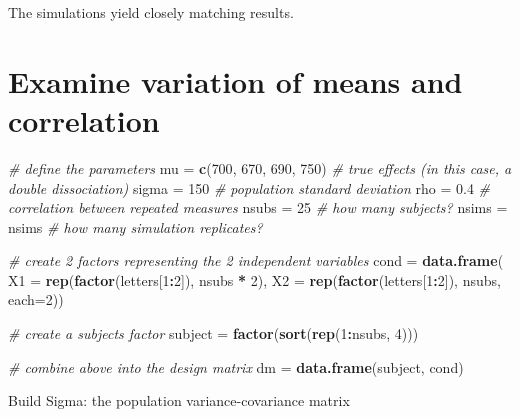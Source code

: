 \documentclass[]{book}
\newenvironment{Shaded}{\begin{snugshade}}{\end{snugshade}}
\newcommand{\CommentTok}[1]{\textcolor[rgb]{0.56,0.35,0.01}{\textit{#1}}}
\newcommand{\DataTypeTok}[1]{\textcolor[rgb]{0.13,0.29,0.53}{#1}}
\newcommand{\DecValTok}[1]{\textcolor[rgb]{0.00,0.00,0.81}{#1}}
\newcommand{\FloatTok}[1]{\textcolor[rgb]{0.00,0.00,0.81}{#1}}
\newcommand{\KeywordTok}[1]{\textcolor[rgb]{0.13,0.29,0.53}{\textbf{#1}}}
\newcommand{\NormalTok}[1]{#1}
\newcommand{\OperatorTok}[1]{\textcolor[rgb]{0.81,0.36,0.00}{\textbf{#1}}}
\newcommand{\StringTok}[1]{\textcolor[rgb]{0.31,0.60,0.02}{#1}}
\begin{document}
The simulations yield closely matching results.

\hypertarget{examine-variation-of-means-and-correlation}{%
\section{Examine variation of means and correlation}\label{examine-variation-of-means-and-correlation}}

\begin{Shaded}
\begin{Highlighting}[]
\CommentTok{# define the parameters}
\NormalTok{mu =}\StringTok{ }\KeywordTok{c}\NormalTok{(}\DecValTok{700}\NormalTok{, }\DecValTok{670}\NormalTok{, }\DecValTok{690}\NormalTok{, }\DecValTok{750}\NormalTok{) }\CommentTok{# true effects (in this case, a double dissociation)}
\NormalTok{sigma =}\StringTok{ }\DecValTok{150}  \CommentTok{# population standard deviation}
\NormalTok{rho =}\StringTok{ }\FloatTok{0.4} \CommentTok{# correlation between repeated measures}
\NormalTok{nsubs =}\StringTok{ }\DecValTok{25} \CommentTok{# how many subjects?}
\NormalTok{nsims =}\StringTok{ }\NormalTok{nsims }\CommentTok{# how many simulation replicates?}
 
\CommentTok{# create 2 factors representing the 2 independent variables}
\NormalTok{cond =}\StringTok{ }\KeywordTok{data.frame}\NormalTok{(}
  \DataTypeTok{X1 =} \KeywordTok{rep}\NormalTok{(}\KeywordTok{factor}\NormalTok{(letters[}\DecValTok{1}\OperatorTok{:}\DecValTok{2}\NormalTok{]), nsubs }\OperatorTok{*}\StringTok{ }\DecValTok{2}\NormalTok{),}
  \DataTypeTok{X2 =} \KeywordTok{rep}\NormalTok{(}\KeywordTok{factor}\NormalTok{(letters[}\DecValTok{1}\OperatorTok{:}\DecValTok{2}\NormalTok{]), nsubs, }\DataTypeTok{each=}\DecValTok{2}\NormalTok{))}
 
\CommentTok{# create a subjects factor}
\NormalTok{subject =}\StringTok{ }\KeywordTok{factor}\NormalTok{(}\KeywordTok{sort}\NormalTok{(}\KeywordTok{rep}\NormalTok{(}\DecValTok{1}\OperatorTok{:}\NormalTok{nsubs, }\DecValTok{4}\NormalTok{)))}
 
\CommentTok{# combine above into the design matrix}
\NormalTok{dm =}\StringTok{ }\KeywordTok{data.frame}\NormalTok{(subject, cond)}
\end{Highlighting}
\end{Shaded}

Build Sigma: the population variance-covariance matrix
\end{document}
